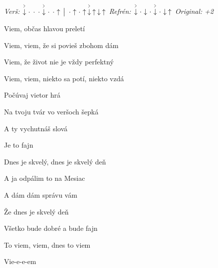 \begin{song}


\textit{Verš:} $\AccentDown\Miss\Miss\Miss\AccentDown\Miss\Miss\Up \Separator \Miss\Up\Miss\Up\AccentDown\Up\Down\Up$ \quad
\textit{Refrén:} $\AccentDown\Miss\Down\Miss\AccentDown\Miss\Down\Up$ \quad
\textit{Original: +2}

\large


\Large

\bigskip

 Viem, občas hlavou preletí \par
Viem, viem, že si povieš zbohom dám  \par
{} Viem, že život nie je vždy perfektný \par
Viem, viem, niekto sa potí, niekto vzdá  \par

\bigskip

\begin{chorusbox}{\PredrefrenARefren}
Počúvaj vietor hrá  \par
{}Na tvoju tvár vo veršoch šepká \par
A ty vychutnáš slová \par
Je to fajn \par

\bigskip

Dnes je skvelý, dnes je skvelý deň \par
A ja odpálim to na Mesiac \par
A dám dám správu vám \par

\bigskip

Že dnes je skvelý deň \par
Všetko bude dobré a bude fajn \par
To viem, viem, dnes to viem \par
\end{chorusbox}

\bigskip

Vie-e-e-em \par


\end{song}
